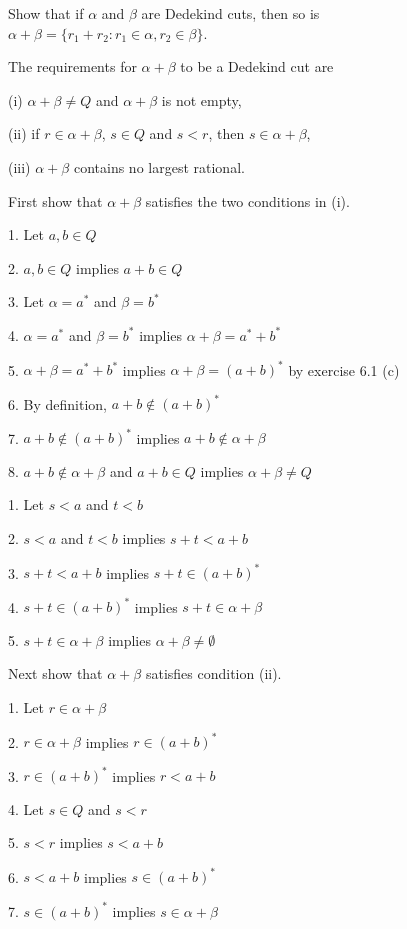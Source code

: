  Show that if $\alpha$ and $\beta$ are Dedekind cuts, then so is
$\alpha+\beta=\{r_1+r_2:r_1\in\alpha, r_2\in\beta\}$.

\bigskip
\noindent
The requirements for $\alpha+\beta$ to be a Dedekind cut are

\medskip
\item{(i)} $\alpha+\beta\ne Q$ and $\alpha+\beta$ is not empty,
\item{(ii)} if $r\in\alpha+\beta$, $s\in Q$ and $s<r$, then $s\in\alpha+\beta$,
\item{(iii)} $\alpha+\beta$ contains no largest rational.

\medskip
\noindent
First show that $\alpha+\beta$ satisfies the two conditions in (i).

\medskip
\item{1.} Let $a,b\in Q$
\item{2.} $a,b\in Q$ implies $a+b\in Q$
\item{3.} Let $\alpha=a^*$ and $\beta=b^*$
\item{4.} $\alpha=a^*$ and $\beta=b^*$ implies $\alpha+\beta=a^*+b^*$
\item{5.} $\alpha+\beta=a^*+b^*$ implies $\alpha+\beta=(a+b)^*$ by exercise 6.1 (c)
\item{6.} By definition, $a+b\not\in(a+b)^*$
\item{7.} $a+b\not\in(a+b)^*$ implies $a+b\not\in\alpha+\beta$
\item{8.} $a+b\not\in\alpha+\beta$ and $a+b\in Q$ implies $\alpha+\beta\ne Q$

\medskip
\item{1.} Let $s<a$ and $t<b$
\item{2.} $s<a$ and $t<b$ implies $s+t<a+b$
\item{3.} $s+t<a+b$ implies $s+t\in(a+b)^*$
\item{4.} $s+t\in(a+b)^*$ implies $s+t\in\alpha+\beta$
\item{5.} $s+t\in\alpha+\beta$ implies $\alpha+\beta\ne\emptyset$

\medskip
\noindent
Next show that $\alpha+\beta$ satisfies condition (ii).

\medskip
\item{1.} Let $r\in\alpha+\beta$
\item{2.} $r\in\alpha+\beta$ implies $r\in(a+b)^*$
\item{3.} $r\in(a+b)^*$ implies $r<a+b$
\item{4.} Let $s\in Q$ and $s<r$
\item{5.} $s<r$ implies $s<a+b$
\item{6.} $s<a+b$ implies $s\in(a+b)^*$
\item{7.} $s\in(a+b)^*$ implies $s\in\alpha+\beta$

